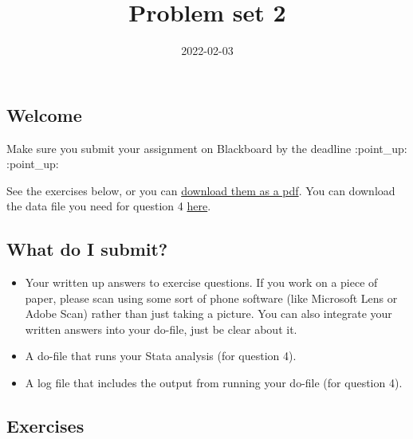 \documentclass[
]{article}
\title{Problem set 2}
\author{}
\date{2022-02-03}
\providecommand{\tightlist}{%
  \setlength{\itemsep}{0pt}\setlength{\parskip}{0pt}}
\begin{document}
\maketitle

\hypertarget{welcome}{%
\subsection{Welcome}\label{welcome}}

Make sure you submit your assignment on Blackboard by the deadline
:point\_up: :point\_up:

See the exercises below, or you can \href{../02-ps.pdf}{download them as
a pdf}. You can download the data file you need for question 4
\href{../collegedistance.dta}{here}.

\hypertarget{what-do-i-submit}{%
\subsection{What do I submit?}\label{what-do-i-submit}}

\begin{itemize}
\tightlist
\item
  Your written up answers to exercise questions. If you work on a piece
  of paper, please scan using some sort of phone software (like
  Microsoft Lens or Adobe Scan) rather than just taking a picture. You
  can also integrate your written answers into your do-file, just be
  clear about it.
\item
  A do-file that runs your Stata analysis (for question 4).
\item
  A log file that includes the output from running your do-file (for
  question 4).
\end{itemize}

\hypertarget{exercises}{%
\subsection{Exercises}\label{exercises}}
\end{document}
